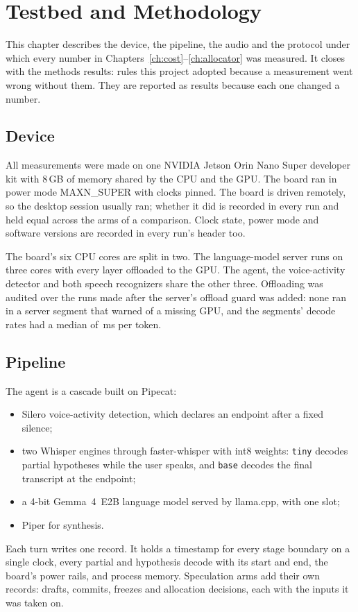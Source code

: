 \chapter{Testbed and Methodology}
\label{ch:methods}

This chapter describes the device, the pipeline, the audio and the protocol
under which every number in Chapters~\ref{ch:cost}--\ref{ch:allocator} was
measured. It closes with the methods results: rules this project adopted
because a measurement went wrong without them. They are reported as results
because each one changed a number.

\section{Device}
\label{sec:device}

All measurements were made on one NVIDIA Jetson Orin Nano Super developer kit
with 8\,GB of memory shared by the CPU and the GPU. The board ran in power mode
MAXN\_SUPER with clocks pinned. The board is driven remotely, so the desktop
session usually ran; whether it did is recorded in every run and held equal
across the arms of a comparison. Clock state, power mode and software versions
are recorded in every run's header too.

The board's six CPU cores are split in two. The language-model server runs on
three cores with every layer offloaded to the GPU. The agent, the voice-activity
detector and both speech recognizers share the other three. Offloading was
audited over the runs made after the server's offload guard was added: none
ran in a server segment that warned of a missing GPU, and the segments' decode
rates had a median of \LlmRate\,ms per token.

\section{Pipeline}
\label{sec:pipeline}

The agent is a cascade built on Pipecat:
\begin{itemize}
\item Silero voice-activity detection, which declares an endpoint after a
  fixed silence;
\item two Whisper engines through faster-whisper with int8 weights:
  \texttt{tiny} decodes partial hypotheses while the user speaks, and
  \texttt{base} decodes the final transcript at the endpoint;
\item a 4-bit Gemma~4~E2B language model served by llama.cpp, with one slot;
\item Piper for synthesis.
\end{itemize}
Each turn writes one record. It holds a timestamp for every stage boundary on a
single clock, every partial and hypothesis decode with its start and end, the
board's power rails, and process memory. Speculation arms add their own
records: drafts, commits, freezes and allocation decisions, each with the
inputs it was taken on.


